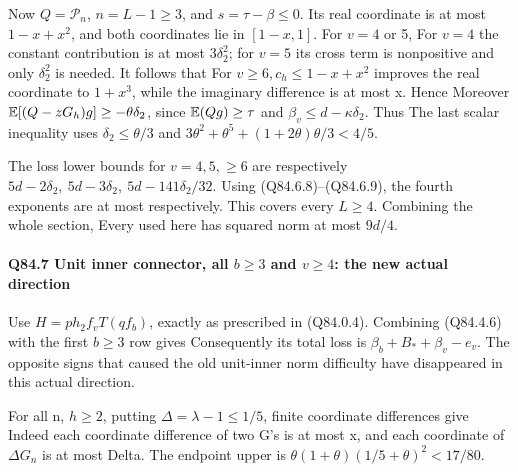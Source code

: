 Now \(Q=\mathcal P_n\), \(n=L-1\ge 3\), and \(s=\tau-\beta\le 0\).
Its real coordinate is at most \(1-x+x^2\), and both coordinates lie
in \([1-x,\allowbreak  1]\). For \(v=4\) or 5,
For \(v=4\) the constant contribution is at most \(3\delta_2^2\); for \(v=5\) its
cross term is nonpositive and only \(\delta_2^2\) is needed. It follows that
For \(v\ge 6,\allowbreak  c_h\le1-x+x^2\) improves the real coordinate to
\(1+x^3\), while the imaginary difference is at most x. Hence
Moreover \(\mathbb E [(Q-zG_h)g]\ge-\theta \delta_2\), since
\(\mathbb E(Qg)\ge\tau\) and \(\beta_v\le d-\kappa \delta_2\).
Thus
The last scalar inequality uses \(\delta_2\le \theta/3\) and
\(3\theta^2+\theta^5+(1+2\theta)\theta/3<4/5\).

The loss lower bounds for \(v=4,\allowbreak  5,\allowbreak \ge 6\) are respectively
\(5d-2\delta_2,\allowbreak  \ 5d-3\delta_2,\allowbreak  \ 5d-141\delta_2/32\).
Using (Q84.6.8)--(Q84.6.9), the fourth exponents are at most
respectively. This covers every \(L\ge 4\). Combining the whole section,
Every used here has squared norm at most \(9d/4\).

\paragraph{Q84.7 Unit inner connector, all \(b\ge 3\) and \(v\ge 4\): the new actual direction}\label{part:Q84.7}

Use \(H=p h_2f_v T(qf_b)\), exactly as prescribed in (Q84.0.4).
Combining (Q84.4.6) with the first \(b\ge 3\) row gives
Consequently its total loss is
\(\beta_b+B_*+\beta_v-e_v\). The opposite signs that caused the old
unit-inner norm difficulty have disappeared in this actual direction.

For all n, \(h\ge 2\), putting \(\Delta=\lambda-1\le1/5\), finite coordinate
differences give
Indeed each coordinate difference of two G's is at most x, and each
coordinate of \(\Delta G_n\) is at most Delta. The endpoint upper is
\(\theta(1+\theta)(1/5+\theta)^2<17/80\).

